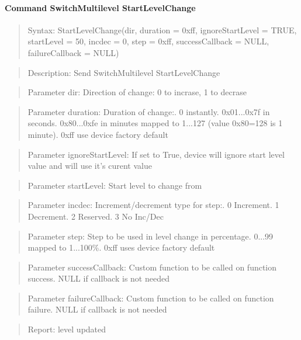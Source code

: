 \paragraph{Command SwitchMultilevel StartLevelChange}
\begin{quote}Syntax: StartLevelChange(dir, duration = 0xff, ignoreStartLevel = TRUE, startLevel = 50, incdec = 0, step = 0xff, successCallback = NULL, failureCallback = NULL)\end{quote}
\begin{quote}Description: Send SwitchMultilevel StartLevelChange\end{quote}
\begin{quote}Parameter dir: Direction of change: 0 to incrase, 1 to decrase\end{quote}
\begin{quote}Parameter duration: Duration of change:. 0 instantly. 0x01...0x7f in seconds. 0x80...0xfe in minutes mapped to 1...127 (value 0x80=128 is 1 minute). 0xff use device factory default\end{quote}
\begin{quote}Parameter ignoreStartLevel: If set to True, device will ignore start level value and will use it's curent value\end{quote}
\begin{quote}Parameter startLevel: Start level to change from\end{quote}
\begin{quote}Parameter incdec: Increment/decrement type for step:. 0 Increment. 1 Decrement. 2 Reserved. 3 No Inc/Dec\end{quote}
\begin{quote}Parameter step: Step to be used in level change in percentage. 0...99 mapped to 1...100\%. 0xff uses device factory default\end{quote}
\begin{quote}Parameter successCallback: Custom function to be called on function success. NULL if callback is not needed\end{quote}
\begin{quote}Parameter failureCallback: Custom function to be called on function failure. NULL if callback is not needed\end{quote}
\begin{quote}Report: level updated\end{quote}

